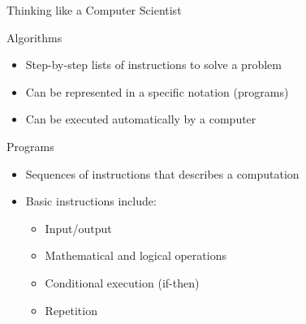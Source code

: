 \begin{frame}{Thinking like a Computer Scientist}
\end{frame}

\begin{frame}{Algorithms}
    \begin{itemize}
        \setlength{\itemsep}{0.75em}
        \item Step\hyp{}by\hyp{}step lists of instructions to solve a problem
        \item Can be represented in a specific notation (programs)
        \item Can be executed automatically by a computer
    \end{itemize}
\end{frame}

\begin{frame}{Programs}
    \begin{itemize}
        \setlength{\itemsep}{0.75em}
        \item Sequences of instructions that describes a computation
        \item Basic instructions include:
              \begin{itemize}
                  \item Input/output
                  \item Mathematical and logical operations
                  \item Conditional execution (if\hyp{}then)
                  \item Repetition
              \end{itemize}
    \end{itemize}
\end{frame}

